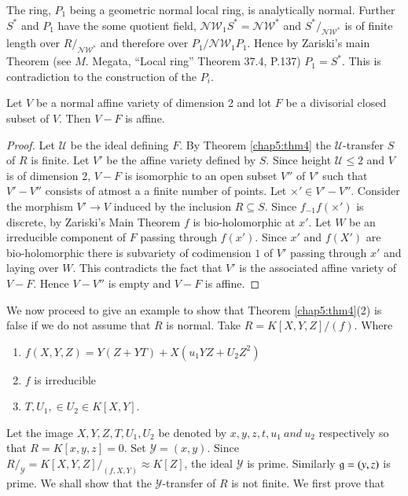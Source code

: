    The ring, $P_{1}$ being a geometric normal local ring, is
    analytically normal. Further $S^*$ and $P_1$ have the some
    quotient field, $\mathscr {NW}_{1} S^* =\mathscr {NW}^*$ and $S^*
    /_{\mathscr {NW}^*}$ is of finite length over $R/_{\mathscr
      {NW}^*}$ and therefore over $P_1/ \mathscr {NW}_1 P_1$. Hence by
    Zariski's main Theorem (see $M$. Megata, ``Local ring'' Theorem
    37.4, P.137) $P_1 =S^*$. This is contradiction to the
    construction of the $P_i$. 
    
\begin{thm}%
  Let $V$ be a normal  affine variety  of dimension 2 and lot $F$ be
  a divisorial closed subset of $V$. Then $V-F$ is affine. 
\end{thm}    
    
\begin{proof}
  Let $\mathscr{U}$ be the ideal defining $F$. By Theorem \ref{chap5:thm4} the
  $\mathscr{U}$-transfer $S$ of $R$ is finite. Let $V'$ be the affine
  variety  defined by $S$. Since height $\mathscr{U}\le 2$ and $V$ is
  of dimension 2, $V-F$ is isomorphic to an open subset $V''$ of $V'$
  such that $V'-V''$ consists of atmost a a finite number\pageoriginale
  of points. Let 
  $\times ' \in V'-V''$. Consider the morphism $V' \to V$ induced by
  the inclusion $R \subseteq S$. Since $f_{-1}f(\times ')$ is discrete,
  by Zariski's Main Theorem $f$ is bio-holomorphic at $x'$. Let $W$ be
  an irreducible component of $F$ passing through $f(x')$. Since $x'$
  and $f(X')$ are bio-holomorphic there is subvariety of codimension
  $1$ of $V'$ passing through $x'$ and laying over $W$. This
  contradicts the fact that $V'$ is the associated affine variety of
  $V-F$. Hence $V-V''$ is empty and $V-F$ is affine.  		   
\end{proof}     

We now proceed to give an example to show that Theorem
\ref{chap5:thm4}(2) is false 
if we do not assume that $R$ is normal. Take $R=K[X,Y,Z]/(f)$. Where 
\begin{enumerate}[(1)]
\item $ f(X,Y,Z)=Y(Z+YT)+X(u_1 YZ+ U_2 Z^2)$ 
\item $f$  is irreducible   
\item $T,U_1, \in U_2 \in K [X,Y]$.
\end{enumerate}  

 Let the image $X,Y,Z,T,U_1,U_2$ be denoted by $x,y,z,t,u_1~and~u_2$
 respectively so that $R=K[x,y,z]=0$. Set $\mathscr{Y}=(x,y)$. Since
 $R/_{\mathscr {Y}}=K[X,Y,Z]/_{(f,X,Y)} \approx K [Z]$, the ideal
 $\mathscr{Y}$ is prime. Similarly $\mathfrak{g}=(y,z)$ is prime. We
 shall show that the $\mathscr{Y}$-transfer of $R$ is not finite. We
 first prove that 
 
